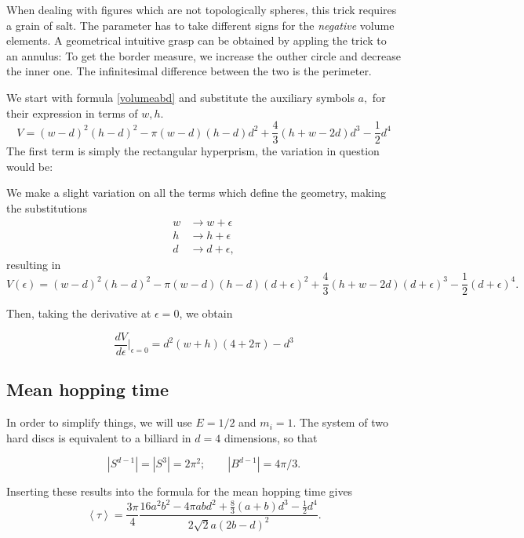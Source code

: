 \documentclass[a4paper,10pt]{article}
\newcommand{\mean}[1]{\left \langle #1 \right \rangle}
\begin{document}
When dealing with figures
which are not topologically spheres, this trick requires
a grain of salt. The parameter has to take different
signs for the \emph{negative} volume elements. A geometrical
intuitive grasp can be obtained by appling the trick to an annulus:
To get the border measure, we increase the outher circle and
decrease the inner one. The infinitesimal difference between the two
is the perimeter. 


 We start with formula \ref{volumeabd}
and substitute the auxiliary symbols $a,$ for their expression in
terms of $w,h$.
\begin{equation}\label{volumehwd}
 V= (w-d)^2(h-d)^2-\pi(w-d)(h-d)d^2+\frac{4}{3}(h+w-2d)d^3-\frac{1}{2}d^4
\end{equation}
The first term is simply the rectangular hyperprism, the variation in question
would be:

We make a slight variation on all the terms which  define the geometry,
making the substitutions
\begin{align}
w & \rightarrow w+\epsilon \\
h & \rightarrow h+\epsilon \\
d & \rightarrow d+\epsilon ,
\end{align}
resulting in
\begin{equation}\label{volumeepsilon}
 V(\epsilon) = (w-d)^2(h-d)^2-\pi(w-d)(h-d)(d+\epsilon)^2+
\frac{4}{3}(h+w-2d)(d+\epsilon)^3-\frac{1}{2}(d+\epsilon)^4.
\end{equation}

Then, taking the derivative at $\epsilon=0$, we obtain

\begin{equation}\label{Areaepsilon}
 \frac{dV}{d\epsilon} \vert_{\epsilon=0}
= d^2(w+h)(4+2\pi)-d^3
\end{equation}


\subsection{Mean hopping time}

In order to simplify things, we will use $E=1/2$ and $m_i=1$.
The system of two hard discs is equivalent to a billiard in $d=4$ dimensions, so that

\begin{equation}
 |S^{d-1}| = |S^3| = 2 \pi^2; \qquad |B^{d-1}| = 4 \pi / 3.
\end{equation}

Inserting these results into the formula for the mean hopping time gives
\begin{equation}
 \mean{\tau} = 	
\frac{3 \pi}{4}
\frac
{16 a^{2} b^{2}  - 4 \pi a b d^{2} + \textstyle \frac{8}{3} (a+b) d^{3}  - \frac{1}{2} d^{4}}
{ 2 \sqrt{2} a ( 2b - d )^2}.
\end{equation}
\end{document}
